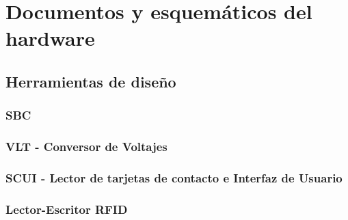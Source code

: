 \chapter{Documentos y esquem\'aticos del hardware}

\section{Herramientas de diseño}
\subsection{SBC}

\subsection{VLT - Conversor de Voltajes}
  

\subsection{SCUI - Lector de tarjetas de contacto e Interfaz de Usuario}
  
%
  
  

\subsection{Lector-Escritor RFID}
  
  

